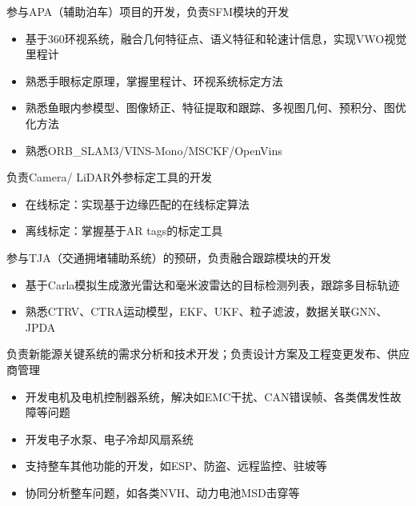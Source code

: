 \documentclass{resume}
\begin{document}
\begin{onehalfspacing}
  参与APA（辅助泊车）项目的开发，负责SFM模块的开发
  \begin{itemize}
    \item 基于360环视系统，融合几何特征点、语义特征和轮速计信息，实现VWO视觉里程计
    \item 熟悉手眼标定原理，掌握里程计、环视系统标定方法
    \item 熟悉鱼眼内参模型、图像矫正、特征提取和跟踪、多视图几何、预积分、图优化方法
    \item 熟悉ORB\_SLAM3/VINS-Mono/MSCKF/OpenVins
  \end{itemize}

  负责Camera/ LiDAR外参标定工具的开发
  \begin{itemize}
    \item 在线标定：实现基于边缘匹配的在线标定算法
    \item 离线标定：掌握基于AR tags的标定工具
  \end{itemize}

  参与TJA（交通拥堵辅助系统）的预研，负责融合跟踪模块的开发
  \begin{itemize}
    \item 基于Carla模拟生成激光雷达和毫米波雷达的目标检测列表，跟踪多目标轨迹
    \item 熟悉CTRV、CTRA运动模型，EKF、UKF、粒子滤波，数据关联GNN、JPDA
  \end{itemize}
\end{onehalfspacing}

负责新能源关键系统的需求分析和技术开发；负责设计方案及工程变更发布、供应商管理

\begin{onehalfspacing}
  \begin{itemize}
    \item 开发电机及电机控制器系统，解决如EMC干扰、CAN错误帧、各类偶发性故障等问题
    \item 开发电子水泵、电子冷却风扇系统
    \item 支持整车其他功能的开发，如ESP、防盗、远程监控、驻坡等
    \item 协同分析整车问题，如各类NVH、动力电池MSD击穿等
  \end{itemize}
\end{onehalfspacing}
\end{document}

